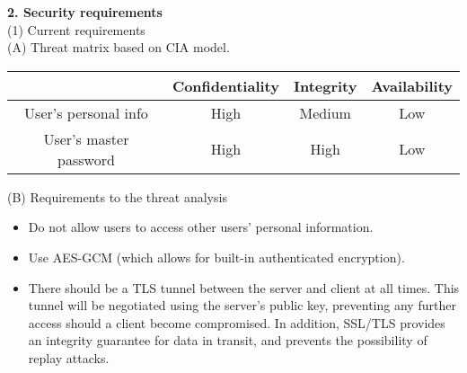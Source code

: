 \documentclass[11pt, letterpaper]{article}
\newcommand{\DesignSection}[1]
{\noindent\textbf{#1}\\}
\begin{document}
\DesignSection{2. Security requirements}
\noindent(1) Current requirements\\
\indent(A) Threat matrix based on CIA model.

\setlength{\tabcolsep}{5pt}
\indent\begin{tabular}{| c | c | c | c |}
    \toprule
      & Confidentiality & Integrity & Availability \\
    \midrule
    User's personal info & High & Medium & Low \\
    \midrule
    User's master password & High & High & Low \\
    \bottomrule
\end{tabular}

\smallskip
\indent(B) Requirements to the threat analysis
\begin{itemize} \itemsep1pt \parskip0pt 
    \item Do not allow users to access other users’ personal information.
    \item Use \ac{AES-GCM} (which allows for built-in authenticated encryption).
    \item There should be a \ac{TLS} tunnel between the server and client at all times. This tunnel will be negotiated using the server’s public key, preventing any further access should a client become compromised. In addition, \ac{SSL}/\ac{TLS} provides an integrity guarantee for data in transit, and prevents the possibility of replay attacks.
\end{itemize}
\end{document}
